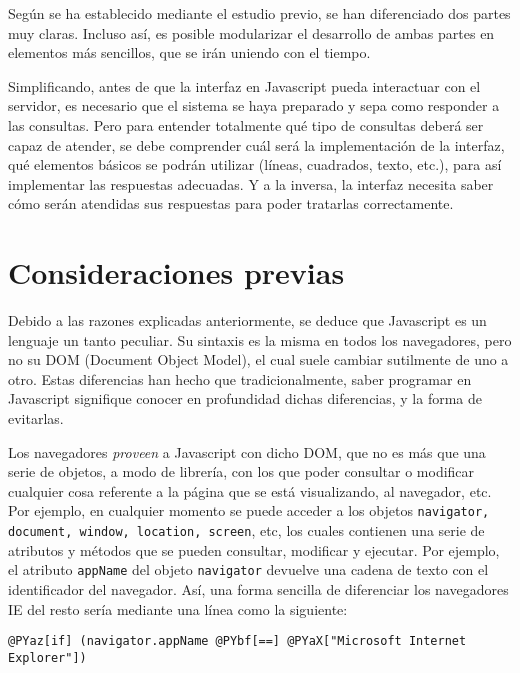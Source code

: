 Según se ha establecido mediante el estudio previo, se han diferenciado dos partes muy claras. Incluso así, es posible modularizar el desarrollo de ambas partes en elementos más sencillos, que se irán uniendo con el tiempo.

Simplificando, antes de que la interfaz en Javascript pueda interactuar con el servidor, es necesario que el sistema se haya preparado y sepa como responder a las consultas. Pero para entender totalmente qué tipo de consultas deberá ser capaz de atender, se debe comprender cuál será la implementación de la interfaz, qué elementos básicos se podrán utilizar (líneas, cuadrados, texto, etc.), para así implementar las respuestas adecuadas. Y a la inversa, la interfaz necesita saber cómo serán atendidas sus respuestas para poder tratarlas correctamente.

\section{Consideraciones previas}
Debido a las razones explicadas anteriormente, se deduce que Javascript es un lenguaje un tanto peculiar. Su sintaxis es la misma en todos los navegadores, pero no su DOM (Document Object Model), el cual suele cambiar sutilmente de uno a otro. Estas diferencias han hecho que tradicionalmente, saber programar en Javascript signifique conocer en profundidad dichas diferencias, y la forma de evitarlas.

Los navegadores \emph{proveen} a Javascript con dicho DOM, que no es más que una serie de objetos, a modo de librería, con los que poder consultar o modificar cualquier cosa referente a la página que se está visualizando, al navegador, etc. Por ejemplo, en cualquier momento se puede acceder a los objetos \texttt{navigator, document, window, location, screen}, etc, los cuales contienen una serie de atributos y métodos que se pueden consultar, modificar y ejecutar. Por ejemplo, el atributo \texttt{appName} del objeto \texttt{navigator} devuelve una cadena de texto con el identificador del navegador. Así, una forma sencilla de diferenciar los navegadores IE del resto sería mediante una línea como la siguiente:

\begin{Verbatim}[commandchars=@\[\]]
@PYaz[if] (navigator.appName @PYbf[==] @PYaX["Microsoft Internet Explorer"]) 
\end{Verbatim}


